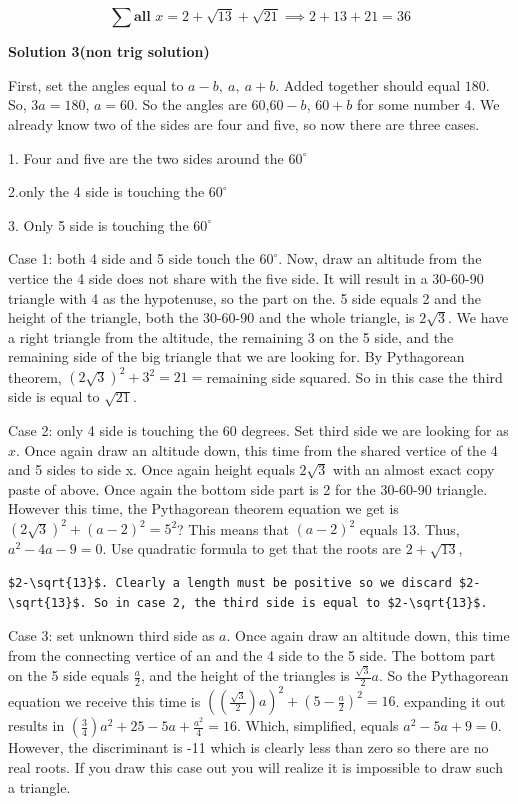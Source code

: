 \begin{enumerate}
 
 \[\sum \textbf{all~} x = 2+\sqrt{13} + \sqrt{21} \implies 2 + 13 + 21 = \boxed{36}\]




\textbf{Solution 3(non trig solution)}

First, set the angles equal to $a-b,~a,~a+b$. Added together should equal $180$. So, $3a=180$, $a=60$. So the angles are $60$,$60-b$, $60+b$ for some number $4$. We already know two of the sides are four and five, so now there are three cases. 

 1. Four and five are the two sides around the $60^{\circ}$

 2.only the 4 side is touching the $60^{\circ}$

 3. Only 5 side is touching the $60^{\circ}$

 Case 1: both 4 side and 5 side touch the $60^{\circ}$. Now, draw an altitude from the vertice the 4 side does not share with the five side. It will result in a 30-60-90 triangle with 4 as the hypotenuse, so the part on the. 5 side equals 2 and the height of the triangle, both the 30-60-90 and the whole triangle, is $2\sqrt{3}$. We have a right triangle from the altitude, the remaining 3 on the 5 side, and the remaining side of the big triangle that we are looking for. By Pythagorean theorem, $(2\sqrt{3})^2+3^2=21=$remaining side squared. So in this case the third side is equal to $\sqrt{21}$.

 Case 2: only 4 side is touching the 60 degrees. Set third side we are looking for as $x$. Once again draw an altitude down, this time from the shared vertice of the 4 and 5 sides to side x. Once again height equals $2\sqrt{3}$ with an almost exact copy paste of above. Once again the bottom side part is 2 for the 30-60-90 triangle. However this time, the Pythagorean theorem equation we get is $(2\sqrt{3})^2 + (a-2)^2 =5^2$? This means that $(a-2)^2$ equals 13. Thus, $a^2-4a-9=0$. Use quadratic formula to get that the roots are $2+\sqrt{13}$,

 \begin{verbatim}
$2-\sqrt{13}$. Clearly a length must be positive so we discard $2-\sqrt{13}$. So in case 2, the third side is equal to $2-\sqrt{13}$.
\end{verbatim}

Case 3: set unknown third side as $a$. Once again draw an altitude down, this time from the connecting vertice of an and the 4 side to the 5 side. The bottom part on the 5 side equals $\frac{a}{2}$, and the height of the triangles is $\frac{\sqrt{3}}{2}a$. So the Pythagorean equation we receive this time is $((\frac{\sqrt{3}}{2})a)^2 +(5-\frac{a}{2})^2 =16$. expanding it out results in $(\frac{3}{4})a^2 + 25-5a+\frac{a^2}{4} =16$. Which, simplified, equals $a^2-5a+9=0$. However, the discriminant is -11 which is clearly less than zero so there are no real roots. If you draw this case out you will realize it is impossible to draw such a triangle. 


\end{enumerate}
